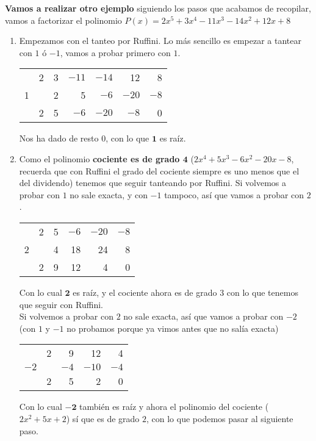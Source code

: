 \documentclass[a4paper,11pt,answers]{exam}
\begin{document}
\textbf{Vamos a realizar otro ejemplo} siguiendo los pasos que acabamos de recopilar, vamos a factorizar el polinomio $P(x) = 2x^5+3x^4-11x^3 -14x^2+12x+8$
\begin{solution}
  \begin{enumerate}
  \item Empezamos con el tanteo por Ruffini. Lo más sencillo es empezar a tantear con $1$ ó $-1$, vamos a probar primero con $1$.
    \begin{center}
      \begin{tabular}{r|rrrrrr}
        &2&3&$-11$&$-14$&12&8\\
        1&&2&5&$-6$&$-20$&$-8$\\
        \hline
        &2&5&$-6$&$-20$&$-8$&0
      \end{tabular}
    \end{center}
    Nos ha dado de resto $0$, con lo que $\boldsymbol{1}$ es raíz.\\
  \item Como el polinomio \textbf{cociente es de grado $\boldsymbol{4}$} ($2x^4+5x^3-6x^2-20x-8$, recuerda que con Ruffini el grado del cociente siempre es uno menos que el del dividendo)
    tenemos que seguir tanteando por Ruffini. Si volvemos a probar con $1$ no sale exacta, y con $-1$ tampoco, así que vamos a probar con $2$.
    \begin{center}
      \begin{tabular}{r|rrrrr}
        &2&5&$-6$&$-20$&$-8$\\
        2&&4&18&24&8\\
        \hline
        &2&9&12&4&0\\
      \end{tabular}
    \end{center}
    Con lo cual $\boldsymbol{2}$ es raíz, y el cociente ahora es de grado $3$ con lo que tenemos que seguir con Ruffini.\\
    Si volvemos a probar con $2$ no sale exacta, así que vamos a probar con $-2$ (con $1$ y $-1$ no probamos porque ya vimos antes que no salía exacta)
    \begin{center}
      \begin{tabular}{r|rrrr}
        &2&9&12&4\\
        $-2$&&$-4$&$-10$&$-4$\\
        \hline
        &2&5&2&0
      \end{tabular}
    \end{center}
    Con lo cual $\boldsymbol{-2}$ también es raíz y ahora el polinomio del cociente ($2x^2 +5x +2$) sí que es de grado $2$, con lo que podemos pasar al siguiente paso.

\end{enumerate}
\end{solution}
\end{document}
